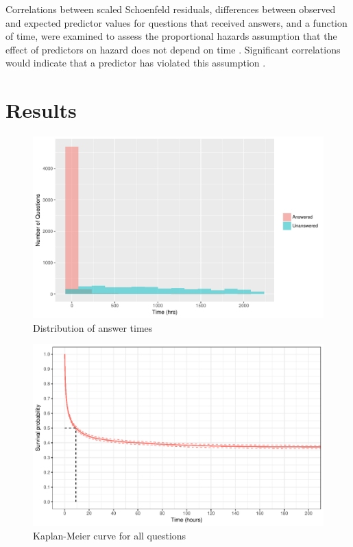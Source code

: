 \documentclass{article}
\begin{document}
Correlations between scaled Schoenfeld residuals, differences between observed and expected predictor values for questions that received answers, and a function of time, were examined to assess the proportional hazards assumption that the effect of predictors on hazard does not depend on time \citep{therneau}. Significant correlations would indicate that a predictor has violated this assumption . 


\section*{Results}


\begin{figure}[h!]
  \includegraphics[scale=1]{times_dist.pdf}
  \caption{Distribution of answer times}
  \label{fig:answertimes}
\end{figure}

\begin{figure}[h!]
  \includegraphics[scale=1]{kmcurve.pdf}
  \caption{Kaplan-Meier curve for all questions}
  \label{fig:kmcurve}
\end{figure}
\end{document}
